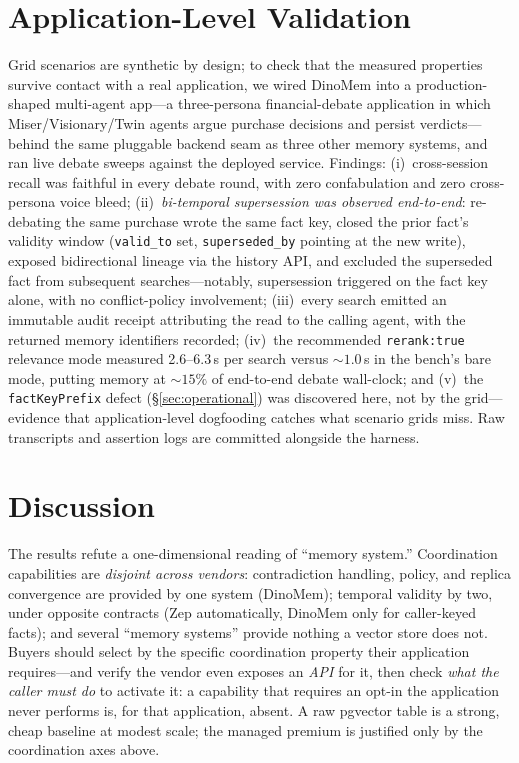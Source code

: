 \documentclass[11pt]{article}
\begin{document}
\section{Application-Level Validation}\label{sec:dogfood}
Grid scenarios are synthetic by design; to check that the measured properties
survive contact with a real application, we wired DinoMem into a production-shaped
multi-agent app---a three-persona financial-debate application in which
Miser/Visionary/Twin agents argue purchase decisions and persist verdicts---behind
the same pluggable backend seam as three other memory systems, and ran live debate
sweeps against the deployed service. Findings: (i)~cross-session recall was faithful
in every debate round, with zero confabulation and zero cross-persona voice bleed;
(ii)~\emph{bi-temporal supersession was observed end-to-end}: re-debating the same
purchase wrote the same fact key, closed the prior fact's validity window
(\texttt{valid\_to} set, \texttt{superseded\_by} pointing at the new write), exposed
bidirectional lineage via the history API, and excluded the superseded fact from
subsequent searches---notably, supersession triggered on the fact key alone, with no
conflict-policy involvement; (iii)~every search emitted an immutable audit receipt
attributing the read to the calling agent, with the returned memory identifiers
recorded; (iv)~the recommended \texttt{rerank:true} relevance mode measured
2.6--6.3\,s per search versus ${\sim}1.0$\,s in the bench's bare mode, putting
memory at ${\sim}15\%$ of end-to-end debate wall-clock; and (v)~the
\texttt{factKeyPrefix} defect (\S\ref{sec:operational}) was discovered here, not by
the grid---evidence that application-level dogfooding catches what scenario grids
miss. Raw transcripts and assertion logs are committed alongside the harness.

\section{Discussion}
The results refute a one-dimensional reading of ``memory system.'' Coordination
capabilities are \emph{disjoint across vendors}: contradiction handling, policy, and
replica convergence are provided by one system (DinoMem); temporal validity by two,
under opposite contracts (Zep automatically, DinoMem only for caller-keyed facts);
and several ``memory systems'' provide nothing a vector store does not. Buyers
should select by the specific coordination property their application requires---and
verify the vendor even exposes an \emph{API} for it, then check \emph{what the
caller must do} to activate it: a capability that requires an opt-in the
application never performs is, for that application, absent. A raw pgvector table is a strong, cheap baseline at
modest scale; the managed premium is justified only by the coordination axes above.
\end{document}
